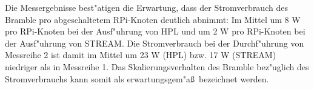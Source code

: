 Die Messergebnisse best"atigen die Erwartung, dass der Stromverbrauch des Bramble pro abgeschaltetem RPi-Knoten deutlich abnimmt: Im Mittel um 8 W pro RPi-Knoten bei der Ausf"uhrung von HPL und um 2 W pro RPi-Knoten bei der Ausf"uhrung von STREAM. Die Stromverbrauch bei der Durchf"uhrung von Messreihe 2 ist damit im Mittel um 23 W (HPL) bzw. 17 W (STREAM) niedriger als in Messreihe 1. Das Skalierungsverhalten des Bramble bez"uglich des Stromverbrauchs kann somit als erwartungsgem"a\ss\ bezeichnet werden. 
\endinput 